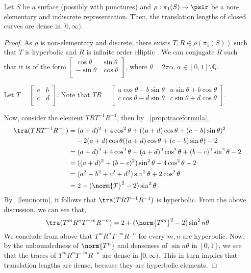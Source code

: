 \begin{theorem}\label{thm:closed_length_spectrum_is_dense}
	Let $S$ be a surface (possibly with punctures) and $\rho: \pi_1(S) \rightarrow \pslr$ be a non-elementary and indiscrete representation. Then, the translation lengths of closed curves are dense in $[0, \infty)$.
\end{theorem}
\begin{proof}
	As $\rho$ is non-elementary and discrete, there exists $T,R \in \rho(\pi_1(S))$ such that $T$ is hyperbolic and $R$ is infinite order elliptic \cite[Chapter 2]{SK}. We can conjugate $R$ such that it is of the form $\begin{bmatrix}
		\cos{\theta} & \sin{\theta} \\
		-\sin{\theta} & \cos{\theta} \\ 
	\end{bmatrix}$, where $\theta = 2 \pi \alpha, \alpha \in [0,1] \setminus \mathbb{Q} $. 
	
	\noindent Let $T= \begin{bmatrix}
		a & b \\
		c & d \\ 
	\end{bmatrix}$. Note that $TR= \begin{bmatrix}
		a \cos{\theta} - b \sin{\theta} & a \sin{\theta} + b \cos{\theta} \\
		c \cos{\theta} - d \sin{\theta} & c \sin{\theta} + d \cos{\theta} \\ 
	\end{bmatrix}$. 
	
	\noindent Now, consider the element $TRT^{-1}R^{-1}$, then by ~\ref{prop:traceformula},
	\begin{align*}
		\tra(TRT^{-1}R^{-1}) &=
		(a+d)^2 + 4\cos^2{\theta} + ((a+d)\cos{\theta} + (c-b) \sin{\theta})^2 \\ & \quad - 2(a+d)\cos{\theta}((a+d)\cos{\theta} + (c-b) \sin{\theta}) - 2 \\
		&= (a+d)^2 + 4\cos^2{\theta} - (a+d)^2 \cos^2{\theta} + (b-c)^2 \sin^2{\theta} - 2 \\
		&= ((a+d)^2 + (b-c)^2) \sin^{2}{\theta} + 4 \cos^2{\theta} - 2   \\
		&= (a^2+b^2+c^2+d^2) \sin^2{\theta} + 2 \cos^2{\theta} \\
		&= 2 + (\norm{T}^2 - 2) \sin^2{\theta}
	\end{align*}
	By ~\ref{lem:norm}, it follows that $\tra(TRT^{-1}R^{-1})$ is hyperbolic. From the above discussion, we can see that,
	$$\tra(T^mR^nT^{-m}R^{-n}) = 2 + (\norm{T^m}^2 - 2)\sin^2{n\theta}$$
	We conclude from above that $T^mR^nT^{-m}R^{-n}$ for every $m,n$ are hyperbolic. 
	Now, by the unboundedness of $\norm{T^n}$ and denseness of $\sin{n \theta}$ in $[0,1]$, we see that the traces of $T^mR^nT^{-m}R^{-n}$ are dense in $[0,\infty)$. This in turn implies that translation lengths are dense, because they are hyperbolic elements.
	
\end{proof}
